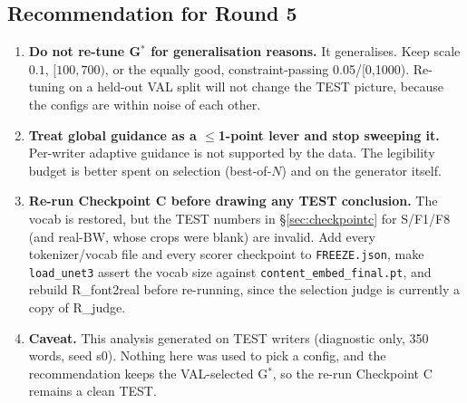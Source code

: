 \documentclass[10.5pt,a4paper]{article}
\newcommand{\fp}[1]{\nolinkurl{#1}}
\begin{document}
\subsection{Recommendation for Round 5}
\begin{enumerate}[nosep]
\item \textbf{Do not re-tune G$^*$ for generalisation reasons.} It generalises. Keep scale $0.1$, $[100,700)$, or
the equally good, constraint-passing 0.05/[0,1000). Re-tuning on a held-out VAL split will not change the TEST
picture, because the configs are within noise of each other.
\item \textbf{Treat global guidance as a $\le$1-point lever and stop sweeping it.} Per-writer adaptive guidance is not
supported by the data. The legibility budget is better spent on selection (best-of-$N$) and on the generator itself.
\item \textbf{Re-run Checkpoint C before drawing any TEST conclusion.} The vocab is restored, but the TEST numbers in
\S\ref{sec:checkpointc} for S/F1/F8 (and real-BW, whose crops were blank) are invalid. Add every tokenizer/vocab
file and every scorer checkpoint to \fp{FREEZE.json}, make \texttt{load\_unet3} assert the vocab size against
\texttt{content\_embed\_final.pt}, and rebuild R\_font2real before re-running, since the selection judge is currently a
copy of R\_judge.
\item \textbf{Caveat.} This analysis generated on TEST writers (diagnostic only, 350 words, seed s0). Nothing here was
used to pick a config, and the recommendation keeps the VAL-selected G$^*$, so the re-run Checkpoint C remains a
clean TEST.
\end{enumerate}
\end{document}
